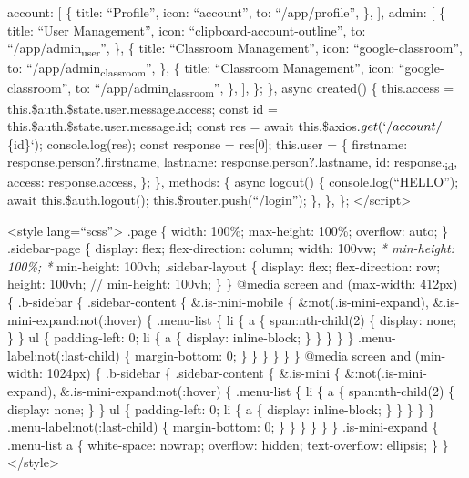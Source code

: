 \documentclass[11pt]{article}
\begin{document}
      account: [
        \{
          title: ``Profile'',
          icon: ``account'',
          to: ``/app/profile'',
        \},
      ],
      admin: [
        \{
          title: ``User Management'',
          icon: ``clipboard-account-outline'',
          to: ``/app/admin\textsubscript{user}'',
        \},
        \{
          title: ``Classroom Management'',
          icon: ``google-classroom'',
          to: ``/app/admin\textsubscript{classroom}'',
        \},
        \{
          title: ``Classroom Management'',
          icon: ``google-classroom'',
          to: ``/app/admin\textsubscript{classroom}'',
        \},
      ],
    \};
  \},
  async created() \{
    this.access = this.\$auth.\$state.user.message.access;
    const id = this.\$auth.\$state.user.message.id;
    const res = await this.\$axios.\(get(`/account/\)\{id\}`);
    console.log(res);
    const response = res[0];
    this.user = \{
      firstname: response.person?.firstname,
      lastname: response.person?.lastname,
      id: response.\textsubscript{id},
      access: response.access,
    \};
  \},
  methods: \{
    async logout() \{
      console.log(``HELLO'');
      await this.\$auth.logout();
      this.\$router.push(``/login'');
    \},
  \},
\};
</script>

<style lang=``scss''>
.page \{
  width: 100\%;
  max-height: 100\%;
  overflow: auto;
\}
.sidebar-page \{
  display: flex;
  flex-direction: column;
  width: 100vw;
  \emph{* min-height: 100\%; *}
  min-height: 100vh;
  .sidebar-layout \{
    display: flex;
    flex-direction: row;
    height: 100vh;
    // min-height: 100vh;
  \}
\}
@media screen and (max-width: 412px) \{
  .b-sidebar \{
    .sidebar-content \{
      \&.is-mini-mobile \{
        \&:not(.is-mini-expand),
        \&.is-mini-expand:not(:hover) \{
          .menu-list \{
            li \{
              a \{
                span:nth-child(2) \{
                  display: none;
                \}
              \}
              ul \{
                padding-left: 0;
                li \{
                  a \{
                    display: inline-block;
                  \}
                \}
              \}
            \}
          \}
          .menu-label:not(:last-child) \{
            margin-bottom: 0;
          \}
        \}
      \}
    \}
  \}
\}
@media screen and (min-width: 1024px) \{
  .b-sidebar \{
    .sidebar-content \{
      \&.is-mini \{
        \&:not(.is-mini-expand),
        \&.is-mini-expand:not(:hover) \{
          .menu-list \{
            li \{
              a \{
                span:nth-child(2) \{
                  display: none;
                \}
              \}
              ul \{
                padding-left: 0;
                li \{
                  a \{
                    display: inline-block;
                  \}
                \}
              \}
            \}
          \}
          .menu-label:not(:last-child) \{
            margin-bottom: 0;
          \}
        \}
      \}
    \}
  \}
\}
.is-mini-expand \{
  .menu-list a \{
    white-space: nowrap;
    overflow: hidden;
    text-overflow: ellipsis;
  \}
\}
</style>
\end{document}
